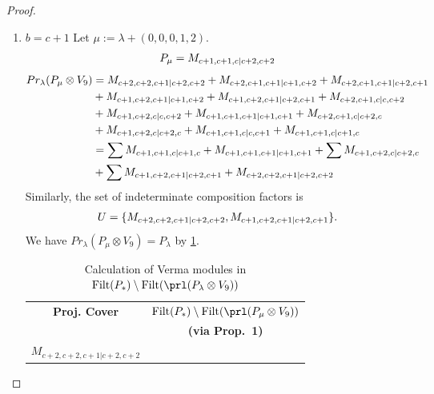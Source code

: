 \begin{proof}
\begin{enumerate}
\begin{enumerate}
      \item $b=c+1$
        Let $\mu:=\lambda + (0,0,0,1,2) $. 
        \begin{equation}\notag
          \begin{aligned}
            P_\mu = M_{c+1,c+1,c|c+2,c+2}
          \end{aligned}
        \end{equation}
        \begin{equation}\notag
          \begin{aligned}
            Pr_{\lambda}(P_\mu \otimes V_{9}) &= 
M_{c+2,c+2,c+1|c+2,c+2}
+M_{c+2,c+1,c+1|c+1,c+2}
+M_{c+2,c+1,c+1|c+2,c+1}\\
                                            &
+M_{c+1,c+2,c+1|c+1,c+2}
+M_{c+1,c+2,c+1|c+2,c+1}
+M_{c+2,c+1,c|c,c+2}\\
                                            &
+M_{c+1,c+2,c|c,c+2}
+M_{c+1,c+1,c+1|c+1,c+1}
+M_{c+2,c+1,c|c+2,c}\\
                                            &
+M_{c+1,c+2,c|c+2,c}
+M_{c+1,c+1,c|c,c+1}
+M_{c+1,c+1,c|c+1,c} \\
                                               &=
\sum M_{c+1,c+1,c|c+1,c}
+ M_{c+1,c+1,c+1|c+1,c+1}
+\sum M_{c+1,c+2,c|c+2,c}\\
                                            &
+\sum M_{c+1,c+2,c+1|c+2,c+1}
+ M_{c+2,c+2,c+1|c+2,c+2}
          \end{aligned}
        \end{equation}
      Similarly, the set of indeterminate composition factors is 
\begin{equation}\notag
  \begin{aligned}
    U = \{
M_{c+2,c+2,c+1|c+2,c+2},
M_{c+1,c+2,c+1|c+2,c+1}
\}.
  \end{aligned}
\end{equation}
       We have $Pr_{\lambda}(P_\mu \otimes V_{9}) = P_\lambda  $ by \cref{tab:verma-analysis_6}. 
\begin{table}[htbp]
\centering
\caption{Calculation of Verma modules in $\operatorname{Filt}(P_*) \setminus \operatorname{Filt}(\prl(P_\lambda \otimes V_9)) $ } \label{tab:verma-analysis_6}
\begin{tabular}{cc}
\toprule
  \textbf{Proj. Cover} & \textbf{$\operatorname{Filt}(P_*) \setminus \operatorname{Filt}(\prl(P_\mu \otimes V_9)) $}  \\
     & \textbf{(via Prop.~1)}  \\
\midrule
  $M_{c+2,c+2,c+1|c+2,c+2}$ & \makecell{
}
\end{tabular}
\end{table}
\end{enumerate}
\end{enumerate}
\end{proof}
